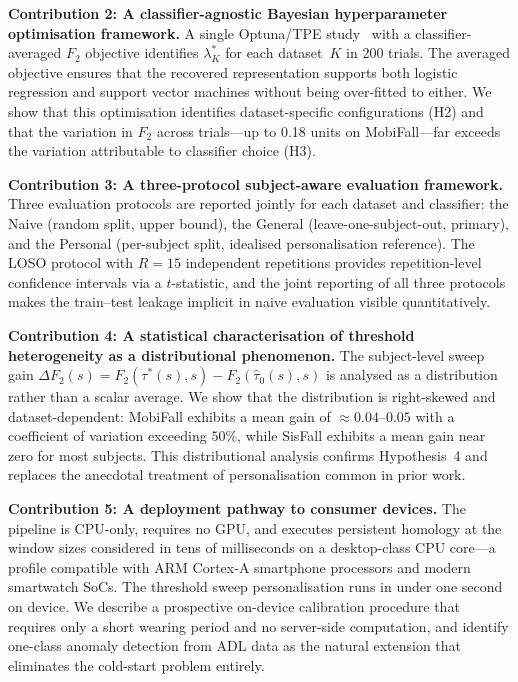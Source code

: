 \textbf{Contribution 2: A classifier-agnostic Bayesian hyperparameter optimisation
framework.}  A single Optuna/TPE study~\parencite{optuna} with a classifier-averaged
$F_2$ objective identifies $\lambda^*_K$ for each dataset~$K$ in 200 trials.  The
averaged objective ensures that the recovered representation supports both logistic
regression and support vector machines without being over-fitted to either.  We show
that this optimisation identifies dataset-specific configurations (H2) and that the
variation in $F_2$ across trials---up to 0.18 units on MobiFall---far exceeds the
variation attributable to classifier choice (H3).

\textbf{Contribution 3: A three-protocol subject-aware evaluation framework.}  Three
evaluation protocols are reported jointly for each dataset and classifier: the Naive
(random split, upper bound), the General (leave-one-subject-out, primary), and the
Personal (per-subject split, idealised personalisation reference).  The LOSO protocol
with $R=15$ independent repetitions provides repetition-level confidence intervals via
a $t$-statistic, and the joint reporting of all three protocols makes the
train--test leakage implicit in naive evaluation visible quantitatively.

\textbf{Contribution 4: A statistical characterisation of threshold heterogeneity
as a distributional phenomenon.}  The subject-level sweep gain
$\Delta F_2(s) = F_2(\tau^*(s), s) - F_2(\hat\tau_0(s), s)$ is analysed as a
distribution rather than a scalar average.  We show that the distribution is
right-skewed and dataset-dependent: MobiFall exhibits a mean gain of ${\approx}0.04$--$0.05$
with a coefficient of variation exceeding $50\%$, while SisFall exhibits a mean gain
near zero for most subjects.  This distributional analysis confirms Hypothesis~4
and replaces the anecdotal treatment of personalisation common in prior work.

\textbf{Contribution 5: A deployment pathway to consumer devices.}  The pipeline
is CPU-only, requires no GPU, and executes persistent homology at the window sizes
considered in tens of milliseconds on a desktop-class CPU core---a profile compatible
with ARM Cortex-A smartphone processors and modern smartwatch SoCs.  The threshold
sweep personalisation runs in under one second on device.  We describe a prospective
on-device calibration procedure that requires only a short wearing period and no
server-side computation, and identify one-class anomaly detection from ADL data as
the natural extension that eliminates the cold-start problem entirely.

